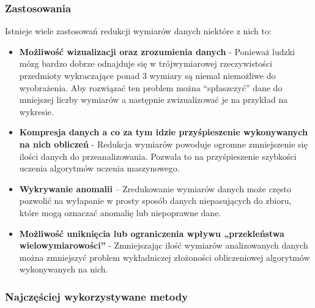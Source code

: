 \subsubsection{Zastosowania}

Istnieje wiele zastosowań redukcji wymiarów danych niektóre z nich to:

\begin{itemize}
	\item \textbf{Możliwość wizualizacji oraz zrozumienia danych} - Ponieważ ludzki mózg bardzo dobrze odnajduje się w trójwymiarowej rzeczywistości przedmioty wykraczające ponad 3 wymiary są niemal niemożliwe do wyobrażenia. Aby rozwiązać ten problem można “spłaszczyć” dane do mniejszej liczby wymiarów a następnie zwizualizować je na przykład na wykresie.
	\item \textbf{Kompresja danych a co za tym idzie przyśpieszenie wykonywanych na nich obliczeń} - Redukcja wymiarów powoduje ogromne zmniejszenie się ilości danych do przeanalizowania. Pozwala to na przyśpieszenie szybkości uczenia algorytmów uczenia maszynowego.
	\item \textbf{Wykrywanie anomalii} – Zredukowanie wymiarów danych może często pozwolić na wyłapanie w prosty sposób danych niepasujących do zbioru, które mogą oznaczać anomalię lub niepoprawne dane.
	\item \textbf{Możliwość uniknięcia lub ograniczenia wpływu „przekleństwa wielowymiarowości”} - Zmniejszając ilość wymiarów analizowanych danych można zmniejszyć problem wykładniczej złożoności obliczeniowej algorytmów wykonywanych na nich.
\end{itemize}

\subsubsection{Najczęściej wykorzystywane metody}

